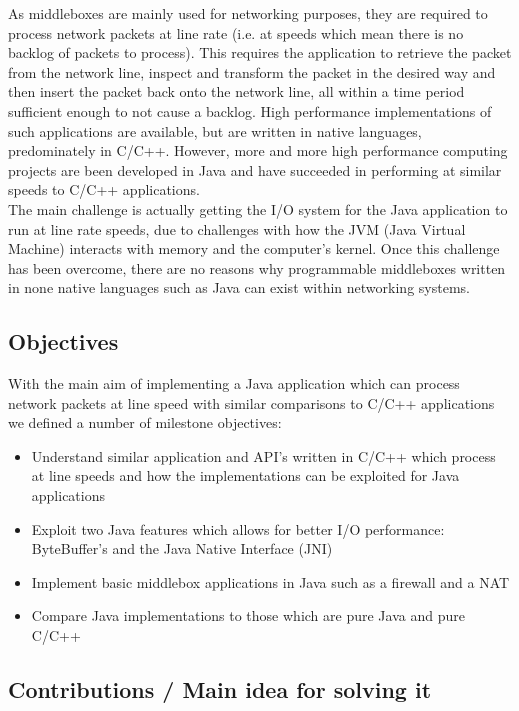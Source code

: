 \documentclass[a4paper, titlepage]{article}
\begin{document}
As middleboxes are mainly used for networking purposes, they are required to process network packets at line rate (i.e. at speeds which mean there is no backlog of packets to process). This requires the application to retrieve the packet from the network line, inspect and transform the packet in the desired way and then insert the packet back onto the network line, all within a time period sufficient enough to not cause a backlog. High performance implementations of such applications are available, but are written in native languages, predominately in C/C++. However, more and more high performance computing projects are been developed in Java and have succeeded in performing at similar speeds to C/C++ applications. \\
\newline
The main challenge is actually getting the I/O system for the Java application to run at line rate speeds, due to challenges with how the JVM (Java Virtual Machine) interacts with memory and the computer's kernel. Once this challenge has been overcome, there are no reasons why programmable middleboxes written in none native languages such as Java can exist within networking systems.

\subsection{Objectives}
With the main aim of implementing a Java application which can process network packets at line speed with similar comparisons to C/C++ applications we defined a number of milestone objectives:
\begin{itemize}
	\item Understand similar application and API's written in C/C++ which process at line speeds and how the implementations can be exploited for Java applications
	\item Exploit two Java features which allows for better I/O performance: ByteBuffer's and the Java Native Interface (JNI)
	\item Implement basic middlebox applications in Java such as a firewall and a NAT
	\item Compare Java implementations to those which are pure Java and pure C/C++
\end{itemize}

\subsection{Contributions / Main idea for solving it}
\end{document}
